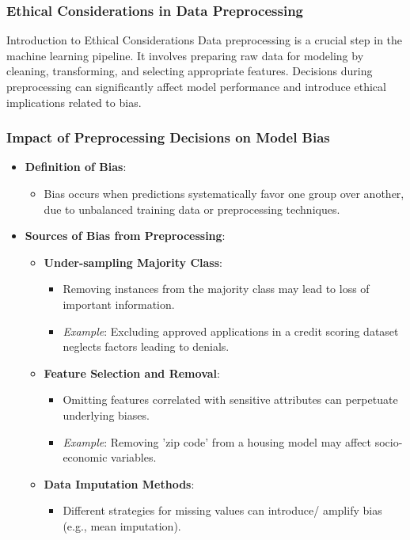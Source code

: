 \documentclass[aspectratio=169]{beamer}
\begin{document}
\begin{frame}[fragile]
    \frametitle{Ethical Considerations in Data Preprocessing}
    \begin{block}{Introduction to Ethical Considerations}
        Data preprocessing is a crucial step in the machine learning pipeline. 
        It involves preparing raw data for modeling by cleaning, transforming, and selecting appropriate features.
        Decisions during preprocessing can significantly affect model performance and introduce ethical implications related to bias.
    \end{block}
\end{frame}

\begin{frame}[fragile]
    \frametitle{Impact of Preprocessing Decisions on Model Bias}
    \begin{itemize}
        \item \textbf{Definition of Bias}:
        \begin{itemize}
            \item Bias occurs when predictions systematically favor one group over another, due to unbalanced training data or preprocessing techniques.
        \end{itemize}
        
        \item \textbf{Sources of Bias from Preprocessing}:
        \begin{itemize}
            \item \textbf{Under-sampling Majority Class}:
            \begin{itemize}
                \item Removing instances from the majority class may lead to loss of important information.
                \item \textit{Example}: Excluding approved applications in a credit scoring dataset neglects factors leading to denials.
            \end{itemize}

            \item \textbf{Feature Selection and Removal}:
            \begin{itemize}
                \item Omitting features correlated with sensitive attributes can perpetuate underlying biases.
                \item \textit{Example}: Removing 'zip code' from a housing model may affect socio-economic variables.
            \end{itemize}

            \item \textbf{Data Imputation Methods}:
            \begin{itemize}
                \item Different strategies for missing values can introduce/ amplify bias (e.g., mean imputation).
            \end{itemize}
        \end{itemize}
    \end{itemize}
\end{frame}
\end{document}
